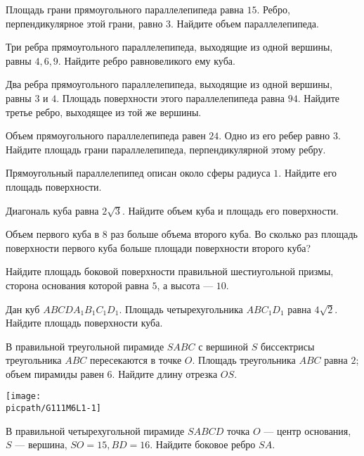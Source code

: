 
\begin{class}[number=1]
	\begin{listofex}
		\item Площадь грани прямоугольного параллелепипеда равна \( 15 \). Ребро, перпендикулярное этой грани, равно \(3\). Найдите объем параллелепипеда.
		\item Три ребра прямоугольного параллелепипеда, выходящие из одной вершины, равны \(4, 6, 9\). Найдите ребро равновеликого ему куба.
		\item Два ребра прямоугольного параллелепипеда, выходящие из одной вершины, равны \(3\) и \(4\). Площадь поверхности этого параллелепипеда равна \(94\). Найдите третье ребро, выходящее из той же вершины.
		\item Объем прямоугольного параллелепипеда равен \(24\). Одно из его ребер равно \(3\). Найдите площадь грани параллелепипеда, перпендикулярной этому ребру.
		\item Прямоугольный параллелепипед описан около сферы радиуса \(1\). Найдите его площадь поверхности.
		\item Диагональ куба равна \( 2\sqrt{3} \). Найдите объем куба и площадь его поверхности.
		\item Объем первого куба в \( 8 \) раз больше объема второго куба. Во сколько раз площадь поверхности первого куба больше площади поверхности второго куба?
		\item Найдите площадь боковой поверхности правильной шестиугольной призмы, сторона основания которой равна \( 5 \), а высота  --- \( 10 \).
		\item Дан куб \( ABCDA_1B_1C_1D_1 \). Площадь четырехугольника \( ABC_1D_1 \) равна \( 4\sqrt{2} \). Найдите площадь поверхности куба.
		\item 
		\begin{minipage}[t]{\bodywidth}
			В правильной треугольной пирамиде \(SABC\) с вершиной \(S\) биссектрисы треугольника \(ABC\) пересекаются в точке \(O\). Площадь треугольника \(ABC\) равна \(2\); объем пирамиды равен \(6\). Найдите длину отрезка \(OS\).
		\end{minipage}
		\hspace{0.02\linewidth}
		\begin{minipage}[t]{\picwidth}
			\texttt{[image: \\picpath/G111M6L1-1]}
		\end{minipage}
		\item В правильной четырехугольной пирамиде \(SABCD\) точка \(O\) --- центр основания, \(S\) --- вершина, \(SO=15, BD=16\). Найдите боковое ребро \(SA\).
		

\end{listofex}
\end{class}
